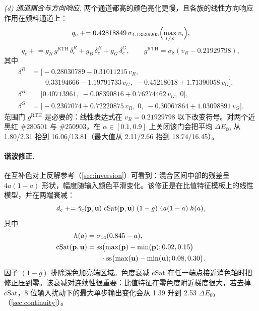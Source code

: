 \emph{(d) 通道耦合与方向响应.} 两个通道都高的颜色亮化更慢，且各族的线性方向响应作用在颜料通道上：
\begin{equation}
q_{c}\mathrel{+}=0.42818849\,\sigma_{4.13539205}\Bigl(\max_{i\ne c}v_{i}\Bigr),
\label{eq:coupling}
\end{equation}
\begin{equation}
q_{c}\mathrel{+}=g_{R}\,g^{\mathrm{RTH}}\,\delta^{R}_{c}+g_{B}\,\delta^{B}_{c}+g_{G}\,\delta^{G}_{c},
\qquad
g^{\mathrm{RTH}}=\sigma_{8}(v_{R}-0.21929798),
\label{eq:directional}
\end{equation}
其中
\begin{align}
\delta^{R}&=\bigl[-0.28030789-0.31011215\,v_{R},\nonumber\\
&\qquad 0.33194666-1.19791733\,v_{G},\; -0.45218018+1.71390058\,v_{G}\bigr],\nonumber\\
\delta^{B}&=\bigl[0.40713961,\; -0.08390816+0.76274462\,v_{G},\; 0\bigr],\label{eq:deltas}\\
\delta^{G}&=\bigl[-0.2367074+0.72220875\,v_{R},\; 0,\; -0.30067864+1.03098891\,v_{G}\bigr].\nonumber
\end{align}
范围门 $g^{\mathrm{RTH}}$ 是必要的：线性表达式在 $v_{R}=0.21929798$ 以下改变符号。对两个近黑红 $\#280501$ 与 $\#250903$，在 $\alpha\in[0.1,0.9]$ 上关闭该门会把平均 $\Delta E_{00}$ 从 1.80/2.31 抬到 16.06/13.81（最大值从 2.11/2.66 抬到 18.74/16.45）。

\paragraph{谐波修正.}
在互补色对上反解参考（\cref{sec:inversion}）可看到：混合区间中部的残差呈 $4a(1-a)$ 形状，幅度随输入颜色平滑变化。该修正是在比值特征模板上的线性模型，并在两端衰减：
\begin{equation}
d_{c}\mathrel{+}=\hat{\gamma}_{c}(\mathbf{p},\mathbf{u})\;\mathrm{cSat}(\mathbf{p},\mathbf{u})\;(1-g)\;4a(1-a)\;h(a),
\label{eq:harmonic}
\end{equation}
其中
\begin{equation}
\begin{aligned}
h(a)&=\sigma_{14}(0.845-a),\\
\mathrm{cSat}(\mathbf{p},\mathbf{u})&=\operatorname{ss}\bigl(\max(\mathbf{p})-\min(\mathbf{p});0.02,0.15\bigr)\\
&\qquad\cdot\operatorname{ss}\bigl(\max(\mathbf{u})-\min(\mathbf{u});0.08,0.30\bigr).
\end{aligned}
\label{eq:csat}
\end{equation}
因子 $(1-g)$ 排除深色加亮端区域。色度衰减 $\mathrm{cSat}$ 在任一端点接近消色轴时把修正压到零。该衰减对连续性很重要：比值特征在零色度附近梯度很大，若去掉 $\mathrm{cSat}$，8 位输入扰动下的最大单步输出变化会从 1.39 升到 2.53 $\Delta E_{00}$（\cref{sec:continuity}）。

